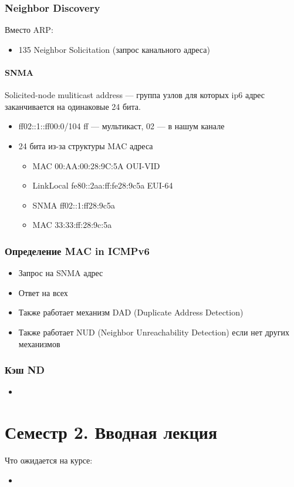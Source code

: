 \documentclass[10pt,a4paper,oneside,titlepage]{report}
\theoremstyle{defenition}
\begin{document}
\subsection{Neighbor Discovery}

Вместо ARP:
\begin{itemize}
	\item 135 Neighbor Solicitation (запрос канального адреса)
\end{itemize}

\subsubsection{SNMA}

Solicited-node muliticast address --- группа узлов для которых ip6 адрес заканчивается на одинаковые 24 бита.

\begin{itemize}
	\item ff02::1::ff00:0/104
	\subitem ff --- мультикаст, 02 --- в нашум канале
	\item 24 бита из-за структуры MAC адреса
	 \begin{itemize}
	 	\item MAC 00:AA:00:28:9C:5A OUI-VID
	 	\item LinkLocal fe80::2aa:ff:fe28:9c5a EUI-64
	 	\item SNMA ff02::1:ff28:9c5a 
	 	\item MAC 33:33:ff:28:9c:5a
	 \end{itemize}
\end{itemize}

\subsection{Определение MAC in ICMPv6}

\begin{itemize}
	\item Запрос на SNMA адрес
	\item Ответ на всех
	\item Также работает механизм DAD (Duplicate Address Detection)
	\item Также работает NUD (Neighbor Unreachability Detection) если нет других механизмов
\end{itemize}

\subsection{Кэш ND}

\begin{itemize}
	\item 
\end{itemize}

\chapter{Семестр 2. Вводная лекция}

Что ожидается на курсе:

\begin{itemize}
	\item 
\end{itemize}
\end{document}
